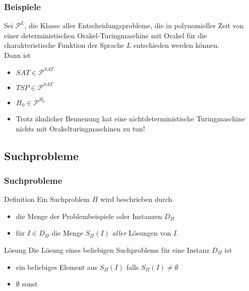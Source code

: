 \documentclass{beamer}
\begin{document}
{\begin{frame}
\frametitle{Beispiele}
Sei $\mathcal{P}^L$, die Klasse aller Entscheidungsprobleme, die in polynomieller Zeit von einer deterministischen Orakel-Turingmaschine mit Orakel für die charakteristische Funktion der Sprache $L$ entschieden werden können.\\
Dann ist
\begin{itemize}
\item $SAT \in \mathcal{P}^{SAT}$
\item $TSP \in \mathcal{P}^{SAT}$ 
\item $H_0 \in \mathcal{P}^{H_0}$
\item Trotz ähnlicher Bennenung hat eine nichtdeterministische Turingmaschine nichts mit Orakelturingmaschinen zu tun!
\end{itemize}
\end{frame}


\subsection{Suchprobleme}
\begin{frame}
 \frametitle{Suchprobleme}
 \begin{block}{Definition}
  Ein Suchproblem $\Pi$ wird beschrieben durch
  \begin{itemize}
   \item die Menge der Problembeispiele oder Instanzen $D_\Pi$
   \item für $I\in D_\Pi$ die Menge $S_\Pi(I)$ \emph{aller} Lösungen von $I$.
  \end{itemize}
 \end{block}
\begin{block}{Lösung}
 Die Lösung eines beliebigen Suchproblems für eine Instanz $D_\Pi$ ist
 \begin{itemize}
  \item ein beliebiges Element aus $S_\Pi(I)$ falls $S_\Pi(I) \not = \emptyset$
  \item $\emptyset$ sonst
 \end{itemize}
\end{block}
\end{frame}

}
\end{document}
